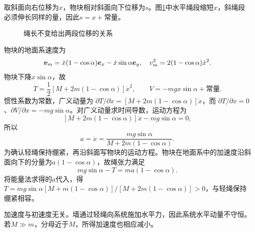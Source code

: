 \begin{solution}
取斜面向右位移为$x$，物块相对斜面向下位移为$s$。图\ref{fig:hw1-1-s}中水平绳段缩短$x$，斜绳段必须伸长同样的量，因此$s=x+\text{常量}$。

\begin{figure}[H]\centering
{}
\caption{绳长不变给出两段位移的关系}\label{fig:hw1-1-s}
\end{figure}

物块的地面系速度为
\[
 \bm{v}_m=\dot x(1-\cos\alpha)\bm{e}_x-\dot x\sin\alpha\bm{e}_y,
 \quad v_m^2=2(1-\cos\alpha)\dot x^2.
\]
物块下降$x\sin\alpha$，故
\[
 T=\frac12[M+2m(1-\cos\alpha)]\dot x^2,
 \qquad V=-mgx\sin\alpha+\text{常量}.
\]
惯性系数为常数，广义动量为 $\partial T/\partial\dot x=[M+2m(1-\cos\alpha)]\dot x$，而 $\partial T/\partial x=0$、$\partial V/\partial x=-mg\sin\alpha$。对广义动量求时间导数，运动方程为
\[
[M+2m(1-\cos\alpha)]\ddot x-mg\sin\alpha=0,
\]
所以
\[
 \boxed{a=\ddot x=\frac{mg\sin\alpha}{M+2m(1-\cos\alpha)}}.
\]
为确认轻绳保持绷紧，再沿斜面写物块的运动方程。物块在地面系中的加速度沿斜面向下的分量为$a(1-\cos\alpha)$，故绳张力满足
\[
 mg\sin\alpha-T=m a(1-\cos\alpha).
\]
将能量法求得的$a$代入，得$T=mg\sin\alpha[M+m(1-\cos\alpha)]/[M+2m(1-\cos\alpha)]>0$，与轻绳保持绷紧相容。

加速度与初速度无关。墙通过轻绳向系统施加水平力，因此系统水平动量不守恒。若$M\gg m$，分母近于$M$，所得加速度也相应减小。



\end{solution}
